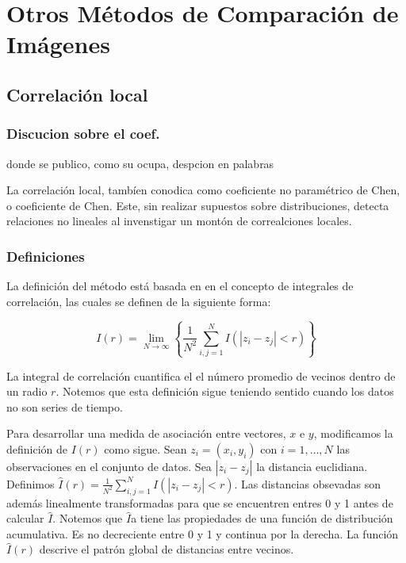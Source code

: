 \chapter{Otros Métodos de Comparación de Imágenes}\label{chap4}


\section[]{Correlaci\'on local} 


	\subsection{Discucion sobre el coef.}

	donde se publico, como su ocupa, despcion en palabras

	La correlaci\'on local, tamb\'ien conodica como coeficiente no param\'etrico de Chen, o coeficiente de Chen. Este, sin realizar supuestos sobre distribuciones, detecta relaciones no lineales al invenstigar un mont\'on de correalciones locales. 

	\subsection{Definiciones}

	La definici\'on del m\'etodo est\'a basada en en el concepto de integrales de correlaci\'on, las cuales se definen de la siguiente forma:
	\begin{defn}
		$$
		I(r)=\lim _{N \rightarrow \infty}\left\{\frac{1}{N^{2}} \sum_{i, j=1}^{N} I\left(\left|z_{i}-z_{j}\right|<r\right)\right\}
		$$
	\end{defn}
	La integral de correlaci\'on cuantifica el el n\'umero promedio de vecinos dentro de un radio $r$. Notemos que esta definici\'on sigue teniendo sentido cuando los datos no son series de tiempo.

	Para desarrollar una medida de asociaci\'on entre vectores, $x$ e $y$, modificamos la definici\'on de $I(r)$ como sigue. Sean $z_i=(x_i,y_i)$ con $i=1,\dots, N$ las observaciones en el conjunto de datos. Sea $|z_i-z_j|$ la distancia euclidiana. Definimos $\hat{I}(r)=\frac{1}{N^{2}} \sum_{i, j=1}^{N} I\left(\left|z_{i}-z_{j}\right|<r\right)$. Las distancias obsevadas son adem\'as linealmente transformadas para que se encuentren entres 0 y 1 antes de calcular $\hat{I}$. Notemos que $\hat{I}$a tiene las propiedades de una funci\'on de distribuci\'on acumulativa. Es no decreciente entre 0 y 1 y continua por la derecha. La funci\'on $\hat{I}(r)$ descrive el patr\'on global de distancias entre vecinos. 

